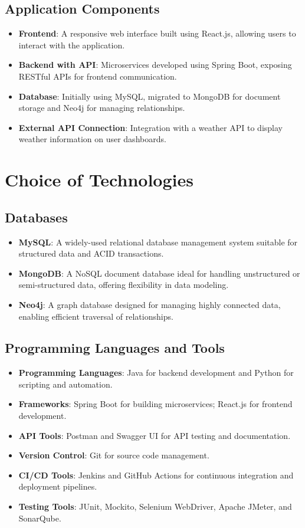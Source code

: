 \documentclass[12pt,a4paper]{report}
\begin{document}
\subsection{Application Components}
\begin{itemize}
    \item \textbf{Frontend}: A responsive web interface built using React.js, allowing users to interact with the application.
    \item \textbf{Backend with API}: Microservices developed using Spring Boot, exposing RESTful APIs for frontend communication.
    \item \textbf{Database}: Initially using MySQL, migrated to MongoDB for document storage and Neo4j for managing relationships.
    \item \textbf{External API Connection}: Integration with a weather API to display weather information on user dashboards.
\end{itemize}

\section{Choice of Technologies}
\subsection{Databases}
\begin{itemize}
    \item \textbf{MySQL}: A widely-used relational database management system suitable for structured data and ACID transactions.
    \item \textbf{MongoDB}: A NoSQL document database ideal for handling unstructured or semi-structured data, offering flexibility in data modeling.
    \item \textbf{Neo4j}: A graph database designed for managing highly connected data, enabling efficient traversal of relationships.
\end{itemize}

\subsection{Programming Languages and Tools}
\begin{itemize}
    \item \textbf{Programming Languages}: Java for backend development and Python for scripting and automation.
    \item \textbf{Frameworks}: Spring Boot for building microservices; React.js for frontend development.
    \item \textbf{API Tools}: Postman and Swagger UI for API testing and documentation.
    \item \textbf{Version Control}: Git for source code management.
    \item \textbf{CI/CD Tools}: Jenkins and GitHub Actions for continuous integration and deployment pipelines.
    \item \textbf{Testing Tools}: JUnit, Mockito, Selenium WebDriver, Apache JMeter, and SonarQube.
\end{itemize}
\end{document}
